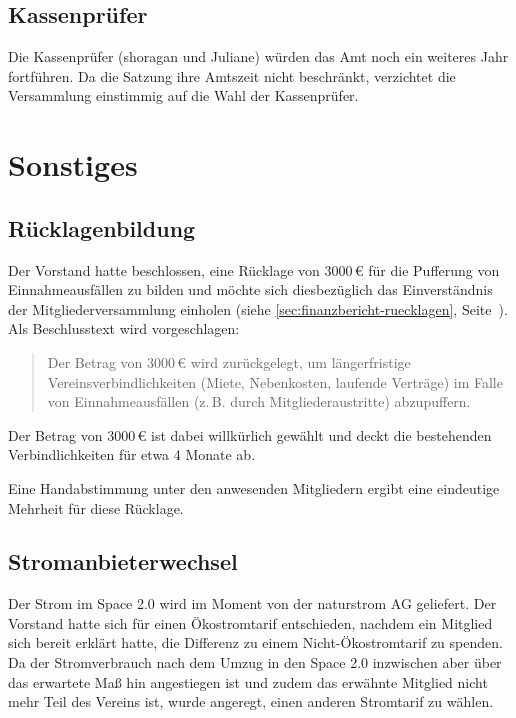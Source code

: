 \documentclass[a4paper,12pt]{scrartcl}
\begin{document}
\subsection*{Kassenprüfer}
Die Kassenprüfer (shoragan und Juliane) würden das Amt noch ein weiteres Jahr
fortführen. Da die Satzung ihre Amtszeit nicht beschränkt, verzichtet die
Versammlung einstimmig auf die Wahl der Kassenprüfer.


\section{Sonstiges}

\subsection{Rücklagenbildung}\label{sec:ruecklagen}
Der Vorstand hatte beschlossen, eine Rücklage von 3000\,€ für die Pufferung von
Einnahmeausfällen zu bilden und möchte sich diesbezüglich das Einverständnis der
Mitgliederversammlung einholen (siehe \ref{sec:finanzbericht-ruecklagen},
Seite~\pageref{sec:finanzbericht-ruecklagen}). Als Beschlusstext wird
vorgeschlagen:

\begin{quote}
  Der Betrag von 3000\,€ wird zurückgelegt, um längerfristige
  Vereinsverbindlichkeiten (Miete, Nebenkosten, laufende Verträge) im Falle
  von Einnahmeausfällen (z.\,B. durch Mitgliederaustritte) abzupuffern.
\end{quote}

Der Betrag von 3000\,€ ist dabei willkürlich gewählt und deckt die bestehenden
Verbindlichkeiten für etwa 4 Monate ab.

Eine Handabstimmung unter den anwesenden Mitgliedern ergibt eine eindeutige
Mehrheit für diese Rücklage.

\subsection{Stromanbieterwechsel}\label{sec:stromanbieter}
Der Strom im Space 2.0 wird im Moment von der naturstrom AG geliefert. Der
Vorstand hatte sich für einen Ökostromtarif entschieden, nachdem ein Mitglied
sich bereit erklärt hatte, die Differenz zu einem Nicht-Ökostromtarif zu
spenden. Da der Stromverbrauch nach dem Umzug in den Space 2.0 inzwischen aber
über das erwartete Maß hin angestiegen ist und zudem das erwähnte Mitglied nicht
mehr Teil des Vereins ist, wurde angeregt, einen anderen Stromtarif zu wählen.
\end{document}
